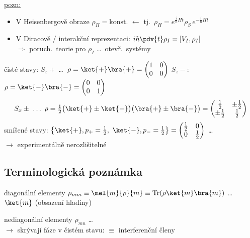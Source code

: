 \underline{pozn:}
\begin{itemize}[nosep]
  \item V Heisenbergově obraze $\rho_H = \text{konst.}$ \quad $\leftarrow$ \quad tj.\ $\rho_H = e^{\frac{i}{\hbar}Ht}\rho_S\,e^{-\frac{i}{\hbar}Ht}$
  \item V Diracově / interakční reprezentaci: \quad $i\hbar\pdv{t}\rho_I = [V_I,\rho_I]$ \\
        \hspace*{4cm} $\Rightarrow$ poruch.\ teorie pro $\rho_I$ \dots\ otevř.\ systémy
\end{itemize}

\begin{priklad}
čisté stavy: \quad
$S_z+$ \dots\ $\rho = \ket{+}\bra{+} = \begin{pmatrix}1&0\\0&0\end{pmatrix}$ \qquad
$S_z-$: \ $\rho = \ket{-}\bra{-} = \begin{pmatrix}0&0\\0&1\end{pmatrix}$
\[
  S_x\pm \ \dots\ \rho = \tfrac12\big(\ket{+}\pm\ket{-}\big)\big(\bra{+}\pm\bra{-}\big) = \begin{pmatrix}\frac12&\pm\frac12\\ \pm\frac12&\frac12\end{pmatrix}
\]
smíšené stavy: \quad $\big\{\ket{+}, p_+ = \tfrac12,\ \ket{-}, p_- = \tfrac12\big\} = \begin{pmatrix}\frac12&0\\0&\frac12\end{pmatrix}$
\quad \dots\  \\
\hspace*{9.5cm} $\to$ experimentálně nerozlišitelné
\end{priklad}

\subsection*{Terminologická poznámka}
diagonální elementy \quad $\rho_{mm} \equiv \mel{m}{\rho}{m} \equiv \operatorname{Tr}(\rho\ket{m}\bra{m})$ \quad \dots\ \textcolor{Red}{\underline{ $\ket{m}$}} (obsazení hladiny)

nediagonální elementy \quad $\rho_{mn}$ \quad \dots\  \\
\hspace*{3.5cm} $\to$ skrývají fáze v čistém stavu: \quad $\equiv$ interferenční členy

